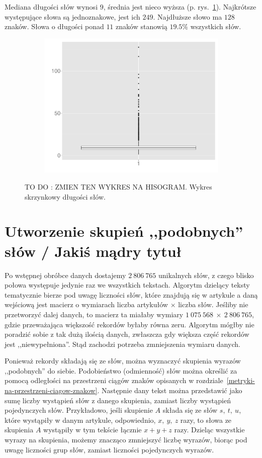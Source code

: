 \documentclass{praca1}
\begin{document}
Mediana długości słów wynosi $9$, średnia jest nieco wyższa (p. rys.~\ref{plot:003}). Najkrótsze występujące słowa są jednoznakowe, jest ich $249$. Najdłuższe słowo ma $128$ znaków. Słowa o długości ponad $11$ znaków stanowią $19.5\%$ wszystkich słów.

\begin{figure}[!h]
  \centering
  \includegraphics[width=350pt, height=200pt]{plot3.pdf}\\
  \caption{TO DO : ZMIEN TEN WYKRES NA HISOGRAM. Wykres skrzynkowy długości słów.}\label{plot:003}
\end{figure}


\section{Utworzenie skupień ,,podobnych'' słów / Jakiś mądry tytuł}

Po wstępnej obróbce danych dostajemy $2\ 806\ 765$ unikalnych słów, z czego blisko połowa występuje jedynie raz we wszystkich tekstach. Algorytm dzielący teksty tematycznie bierze pod uwagę liczności słów, które znajdują się w artykule a daną wejściową jest macierz o wymiarach liczba artykułów $\times$ liczba słów. Jeśliby nie przetworzyć dalej danych, to macierz ta miałaby wymiary $1\ 075\ 568\ \times\ 2\ 806\ 765$, gdzie przeważająca większość rekordów byłaby równa zeru. Algorytm mógłby nie poradzić sobie z tak dużą ilością danych, zwłaszcza gdy większa część rekordów jest ,,niewypełniona''. Stąd zachodzi potrzeba zmniejszenia wymiaru danych. 

Ponieważ rekordy składają się ze słów, można wyznaczyć skupienia wyrazów ,,podobnych'' do siebie. Podobieństwo (odmienność) słów można określić za pomocą odległości na przestrzeni ciągów znaków opisanych w rozdziale~\ref{metryki-na-przestrzeni-ciagow-znakow}. Następnie dany tekst można przedstawić jako sumę liczby wystąpień słów z danego skupienia, zamiast liczby wystąpień pojedynczych słów. Przykładowo, jeśli skupienie $A$ składa się ze słów $s,\ t,\ u$, które wystąpiły w danym artykule, odpowiednio, $x,\ y,\ z$ razy, to słowa ze skupienia $A$ wystąpiły w tym tekście łącznie $x+y+z$ razy. Dzieląc wszystkie wyrazy na skupienia, możemy znacząco zmniejszyć liczbę wyrazów, biorąc pod uwagę liczności grup słów, zamiast liczności pojedynczych wyrazów.
\end{document}
